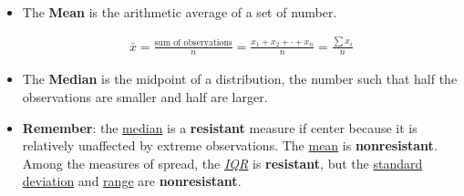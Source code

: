 \documentclass[Main.tex]{subfiles}
\begin{document}
	\begin{exercise} \hfill \\
		
		\begin{itemize}
			\item The \textbf{Mean} is the arithmetic average of a set of number.
			\begin{definition}[Mean]				
				\begin{subequations}
					\begin{align}
					\bar{x}=\frac{\text{sum of observations}}{n}=\frac{x_{1}+x_{2}+\cdot +x_{n}}{n}=\frac{\sum x_{i}}{n}
					\end{align}
				\end{subequations}
			\end{definition} \hfill
			
			\item The \textbf{Median} is the midpoint of a distribution, the number such that half the observations are smaller and half are larger.\\
			
			\item \textbf{Remember}: the \underline{median} is a \textbf{resistant} measure if center because it is relatively unaffected by extreme observations. The \underline{mean} is \textbf{nonresistant}. Among the measures of spread, the \emph{\underline{IQR}} is \textbf{resistant}, but the \underline{standard deviation} and \underline{range} are \textbf{nonresistant}.
		\end{itemize}	
	\end{exercise}
	
\end{document}
